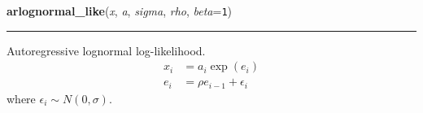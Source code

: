 

    \label{pymc:distributions:arlognormal_like}

    \vspace{0.5ex}

\hspace{.8\funcindent}\begin{boxedminipage}{\funcwidth}

    \raggedright \textbf{arlognormal\_like}(\textit{x}, \textit{a}, \textit{sigma}, \textit{rho}, \textit{beta}={\tt 1})

    \vspace{-1.5ex}

    \rule{\textwidth}{1pt}
\setlength{\parskip}{2ex}

Autoregressive lognormal log-likelihood.
\begin{equation*}\begin{split}x_i & = a_i \exp(e_i) \\e_i & = \rho e_{i-1} + \epsilon_i\end{split}\end{equation*}
where $\epsilon_i \sim N(0,\sigma)$.
\setlength{\parskip}{1ex}
    \end{boxedminipage}

    \label{pymc:distributions:bernoulli_like}

    \vspace{0.5ex}

